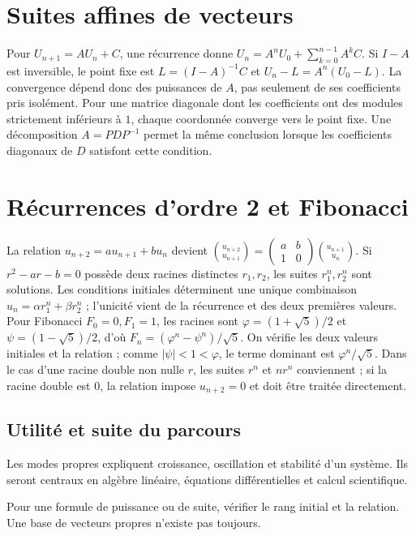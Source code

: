 \documentclass[../cours_tle.tex]{subfiles}
\begin{document}
\section{Suites affines de vecteurs}
Pour $U_{n+1}=AU_n+C$, une récurrence donne
$U_n=A^nU_0+\sum_{k=0}^{n-1}A^kC$.
Si $I-A$ est inversible, le point fixe est $L=(I-A)^{-1}C$ et
$U_n-L=A^n(U_0-L)$.
La convergence dépend donc des puissances de $A$, pas seulement de ses coefficients pris isolément.
Pour une matrice diagonale dont les coefficients ont des modules strictement inférieurs à $1$, chaque coordonnée converge vers le point fixe. Une décomposition $A=PDP^{-1}$ permet la même conclusion lorsque les coefficients diagonaux de $D$ satisfont cette condition.
\section{Récurrences d'ordre 2 et Fibonacci}
La relation $u_{n+2}=au_{n+1}+bu_n$ devient
$\binom{u_{n+2}}{u_{n+1}}=\begin{pmatrix}a&b\\1&0\end{pmatrix}\binom{u_{n+1}}{u_n}$.
Si $r^2-ar-b=0$ possède deux racines distinctes $r_1,r_2$, les suites $r_1^n,r_2^n$ sont solutions. Les conditions initiales déterminent une unique combinaison $u_n=\alpha r_1^n+\beta r_2^n$ ; l'unicité vient de la récurrence et des deux premières valeurs.
Pour Fibonacci $F_0=0,F_1=1$, les racines sont $\varphi=(1+\sqrt5)/2$ et $\psi=(1-\sqrt5)/2$, d'où
$F_n=(\varphi^n-\psi^n)/\sqrt5$.
On vérifie les deux valeurs initiales et la relation ; comme $|\psi|<1<\varphi$, le terme dominant est $\varphi^n/\sqrt5$.
Dans le cas d'une racine double non nulle $r$, les suites $r^n$ et $nr^n$ conviennent ; si la racine double est $0$, la relation impose $u_{n+2}=0$ et doit être traitée directement.
\begin{finchapitre}
\section{Utilité et suite du parcours}
Les modes propres expliquent croissance, oscillation et stabilité d'un système. Ils seront centraux en algèbre linéaire, équations différentielles et calcul scientifique.
\begin{retenir}
Pour une formule de puissance ou de suite, vérifier le rang initial et la relation. Une base de vecteurs propres n'existe pas toujours.
\end{retenir}
\end{finchapitre}
\end{document}
